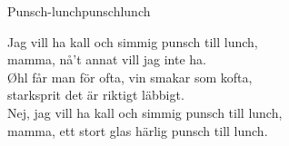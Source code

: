 \begin{song}{Punsch-lunch}{punschlunch}
\begin{vers}
Jag vill ha kall och simmig punsch till lunch,\\
mamma, nå't annat vill jag inte ha.\\
Øhl får man för ofta, vin smakar som kofta,\\
starksprit det är riktigt läbbigt.\\
Nej, jag vill ha kall och simmig punsch till lunch,\\
mamma, ett stort glas härlig punsch till lunch.\\
\end{vers}
\end{song}
